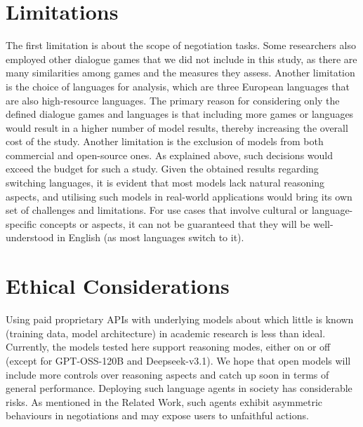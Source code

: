 \documentclass[11pt]{article}
\begin{document}
\section*{Limitations}

The first limitation is about the scope of negotiation tasks. Some researchers also employed other dialogue games that we did not include in this study, as there are many similarities among games and the measures they assess. Another limitation is the choice of languages for analysis, which are three European languages that are also high-resource languages. The primary reason for considering only the defined dialogue games and languages is that including more games or languages would result in a higher number of model results, thereby increasing the overall cost of the study. Another limitation is the exclusion of models from both commercial and open-source ones. As explained above, such decisions would exceed the budget for such a study. Given the obtained results regarding switching languages, it is evident that most models lack natural reasoning aspects, and utilising such models in real-world applications would bring its own set of challenges and limitations. For use cases that involve cultural or language-specific concepts or aspects, it can not be guaranteed that they will be well-understood in English (as most languages switch to it).

\section*{Ethical Considerations}

Using paid proprietary APIs with underlying models about which little is known (training data, model architecture) in academic research is less than ideal. Currently, the models tested here support reasoning modes, either on or off (except for GPT-OSS-120B and Deepseek-v3.1). We hope that open models will include more controls over reasoning aspects and catch up soon in terms of general performance. Deploying such language agents in society has considerable risks. As mentioned in the Related Work, such agents exhibit asymmetric behaviours in negotiations and may expose users to unfaithful actions.

%


\end{document}
